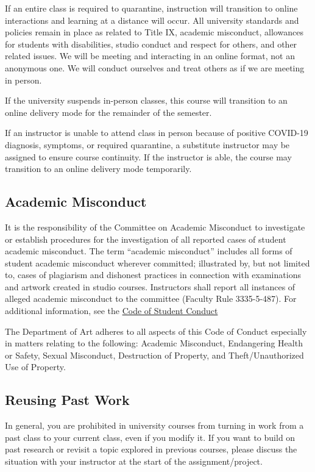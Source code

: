 If an entire class is required to quarantine, instruction will transition to online interactions and learning at a distance will occur. All university standards and policies remain in place as related to Title IX, academic misconduct, allowances for students with disabilities, studio conduct and respect for others, and other related issues. We will be meeting and interacting in an online format, not an anonymous one. We will conduct ourselves and treat others as if we are meeting in person.


If the university suspends in-person classes, this course will transition to an online delivery mode for the remainder of the semester.

If an instructor is unable to attend class in person because of positive COVID-19 diagnosis, symptoms, or required quarantine, a substitute instructor may be assigned to ensure course continuity. If the instructor is able, the course may transition to an online delivery mode temporarily.

\subsection{Academic Misconduct}

It is the responsibility of the Committee on Academic Misconduct to investigate or establish procedures for the investigation of all reported cases of student academic misconduct. The term ``academic misconduct'' includes all forms of student academic misconduct wherever committed; illustrated by, but not limited to, cases of plagiarism and dishonest practices in connection with examinations and artwork created in studio courses. Instructors shall report all instances of alleged academic misconduct to the committee (Faculty Rule 3335-5-487). For additional information, see the \href{https://studentconduct.osu.edu/for-students/understanding-the-student-conduct-process/}{Code of Student Conduct}

The Department of Art adheres to all aspects of this Code of Conduct especially in matters relating to the following: Academic Misconduct, Endangering Health or Safety, Sexual Misconduct, Destruction of Property, and Theft/Unauthorized Use of Property.

\subsection{Reusing Past Work}

In general, you are prohibited in university courses from turning in work from a past class to your current class, even if you modify it. If you want to build on past research or revisit a topic explored in previous courses, please discuss the situation with your instructor at the start of the assignment/project.

